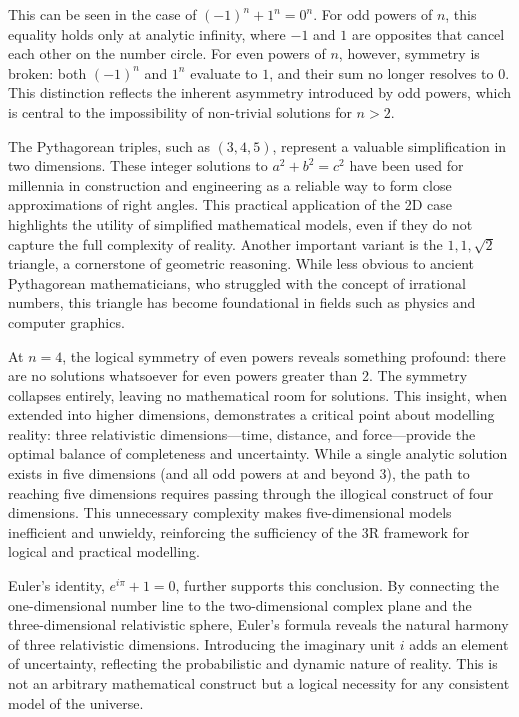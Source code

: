 \documentclass[12pt]{article}
\begin{document}
This can be seen in the case of \((-1)^n + 1^n = 0^n\). For odd powers of \(n\), this equality holds only at analytic infinity, where \(-1\) and \(1\) are opposites that cancel each other on the number circle. For even powers of \(n\), however, symmetry is broken: both \((-1)^n\) and \(1^n\) evaluate to \(1\), and their sum no longer resolves to \(0\). This distinction reflects the inherent asymmetry introduced by odd powers, which is central to the impossibility of non-trivial solutions for \(n > 2\).

The Pythagorean triples, such as \((3, 4, 5)\), represent a valuable simplification in two dimensions. These integer solutions to \(a^2 + b^2 = c^2\) have been used for millennia in construction and engineering as a reliable way to form close approximations of right angles. This practical application of the 2D case highlights the utility of simplified mathematical models, even if they do not capture the full complexity of reality. Another important variant is the \(1, 1, \sqrt{2}\) triangle, a cornerstone of geometric reasoning. While less obvious to ancient Pythagorean mathematicians, who struggled with the concept of irrational numbers, this triangle has become foundational in fields such as physics and computer graphics.

At \(n = 4\), the logical symmetry of even powers reveals something profound: there are no solutions whatsoever for even powers greater than 2. The symmetry collapses entirely, leaving no mathematical room for solutions. This insight, when extended into higher dimensions, demonstrates a critical point about modelling reality: three relativistic dimensions—time, distance, and force—provide the optimal balance of completeness and uncertainty. While a single analytic solution exists in five dimensions (and all odd powers at and beyond 3), the path to reaching five dimensions requires passing through the illogical construct of four dimensions. This unnecessary complexity makes five-dimensional models inefficient and unwieldy, reinforcing the sufficiency of the 3R framework for logical and practical modelling.

Euler’s identity, \(e^{i\pi} + 1 = 0\), further supports this conclusion. By connecting the one-dimensional number line to the two-dimensional complex plane and the three-dimensional relativistic sphere, Euler’s formula reveals the natural harmony of three relativistic dimensions. Introducing the imaginary unit \(i\) adds an element of uncertainty, reflecting the probabilistic and dynamic nature of reality. This is not an arbitrary mathematical construct but a logical necessity for any consistent model of the universe.
\end{document}

